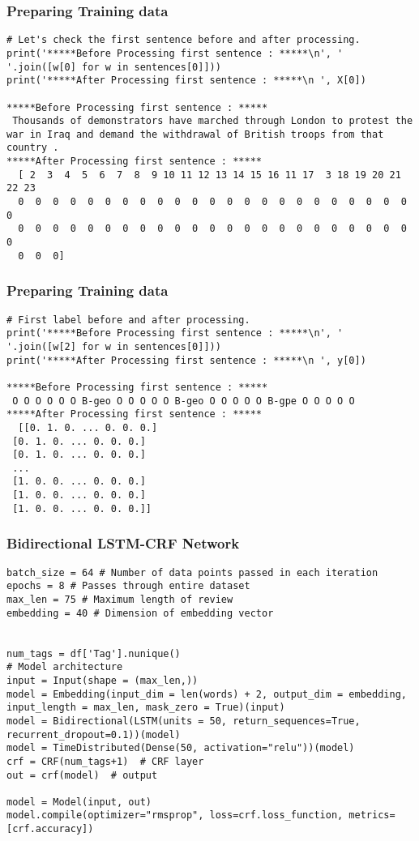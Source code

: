 \begin{frame}[fragile]\frametitle{Preparing Training data}

\begin{lstlisting}
# Let's check the first sentence before and after processing.
print('*****Before Processing first sentence : *****\n', ' '.join([w[0] for w in sentences[0]]))
print('*****After Processing first sentence : *****\n ', X[0])

*****Before Processing first sentence : *****
 Thousands of demonstrators have marched through London to protest the war in Iraq and demand the withdrawal of British troops from that country .
*****After Processing first sentence : *****
  [ 2  3  4  5  6  7  8  9 10 11 12 13 14 15 16 11 17  3 18 19 20 21 22 23
  0  0  0  0  0  0  0  0  0  0  0  0  0  0  0  0  0  0  0  0  0  0  0  0
  0  0  0  0  0  0  0  0  0  0  0  0  0  0  0  0  0  0  0  0  0  0  0  0
  0  0  0]
\end{lstlisting}
\end{frame}

\begin{frame}[fragile]\frametitle{Preparing Training data}

\begin{lstlisting}
# First label before and after processing.
print('*****Before Processing first sentence : *****\n', ' '.join([w[2] for w in sentences[0]]))
print('*****After Processing first sentence : *****\n ', y[0])

*****Before Processing first sentence : *****
 O O O O O O B-geo O O O O O B-geo O O O O O B-gpe O O O O O
*****After Processing first sentence : *****
  [[0. 1. 0. ... 0. 0. 0.]
 [0. 1. 0. ... 0. 0. 0.]
 [0. 1. 0. ... 0. 0. 0.]
 ...
 [1. 0. 0. ... 0. 0. 0.]
 [1. 0. 0. ... 0. 0. 0.]
 [1. 0. 0. ... 0. 0. 0.]]
\end{lstlisting}
\end{frame}


\begin{frame}[fragile]\frametitle{Bidirectional LSTM-CRF Network}
\begin{lstlisting}
batch_size = 64 # Number of data points passed in each iteration
epochs = 8 # Passes through entire dataset
max_len = 75 # Maximum length of review
embedding = 40 # Dimension of embedding vector


num_tags = df['Tag'].nunique()
# Model architecture
input = Input(shape = (max_len,))
model = Embedding(input_dim = len(words) + 2, output_dim = embedding, input_length = max_len, mask_zero = True)(input)
model = Bidirectional(LSTM(units = 50, return_sequences=True, recurrent_dropout=0.1))(model)
model = TimeDistributed(Dense(50, activation="relu"))(model)
crf = CRF(num_tags+1)  # CRF layer
out = crf(model)  # output

model = Model(input, out)
model.compile(optimizer="rmsprop", loss=crf.loss_function, metrics=[crf.accuracy])
\end{lstlisting}
\end{frame}

